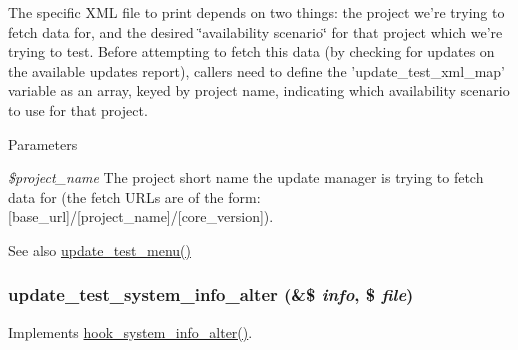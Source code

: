The specific XML file to print depends on two things: the project we're trying to fetch data for, and the desired \char`\"{}availability scenario\char`\"{} for that project which we're trying to test. Before attempting to fetch this data (by checking for updates on the available updates report), callers need to define the 'update\_\-test\_\-xml\_\-map' variable as an array, keyed by project name, indicating which availability scenario to use for that project.


\begin{DoxyParams}{Parameters}
\item[{\em \$project\_\-name}]The project short name the update manager is trying to fetch data for (the fetch URLs are of the form: \mbox{[}base\_\-url\mbox{]}/\mbox{[}project\_\-name\mbox{]}/\mbox{[}core\_\-version\mbox{]}).\end{DoxyParams}
\begin{DoxySeeAlso}{See also}
\hyperlink{update__test_8module_a65e97dbd4657523edc1297af8ddc1f51}{update\_\-test\_\-menu()} 
\end{DoxySeeAlso}
\hypertarget{update__test_8module_affa94787d8b78916e1f9625114d8f15f}{
\subsubsection[{update\_\-test\_\-system\_\-info\_\-alter}]{\setlength{\rightskip}{0pt plus 5cm}update\_\-test\_\-system\_\-info\_\-alter (\&\$ {\em info}, \/  \$ {\em file})}}
\label{update__test_8module_affa94787d8b78916e1f9625114d8f15f}
Implements \hyperlink{group__hooks_ga7dd7f887131916d5bbbb02ae87a9113e}{hook\_\-system\_\-info\_\-alter()}.

